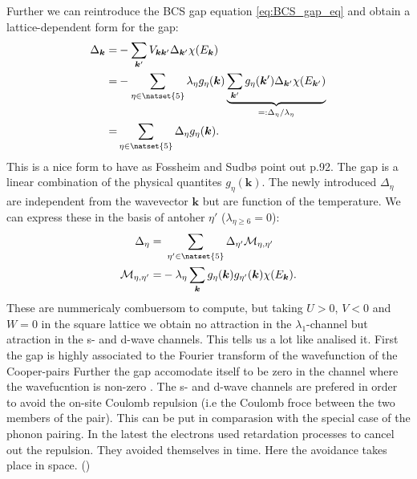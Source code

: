 \documentclass[../main.tex]{subfile}
\begin{document}
Further we can reintroduce the BCS gap equation \ref{eq:BCS_gap_eq} and obtain a lattice-dependent form for the gap:
\begin{equation}
    \begin{aligned}
    \Delta_{\bm{k}} =& -\sum_{\bm{k}'} V_{\bm{k}\bm{k}'}\Delta_{\bm{k}'}\chi(E_{\bm{k}})\\
    =& -\sum_{\eta\in\natset{5}} \lambda_{\eta} g_{\eta}(\bm{k}) \underbrace{\sum_{\bm{k}'} g_{\eta}(\bm{k}') \Delta_{\bm{k}'}\chi(E_{\bm{k}'})}_{=: \Delta_{\eta}/\lambda_{\eta}}\\
    =& \sum_{\eta\in\natset{5}}\Delta_{\eta} g_{\eta}(\bm{k}).
    \end{aligned}
\end{equation}
This is a nice form to have as Fossheim and Sudbø \cite{FossheimSudbo2004} point out p.92. The gap is a linear combination of the physical quantites $g_{\eta}(\bm{k})$.
The newly introduced $\Delta_{\eta}$ are independent from the wavevector $\bm{k}$ but are function of the temperature. We can express these in the basis 
of antoher $\eta'$ ($\lambda_{\eta\ge6} =0$):
\begin{align*}
    \Delta_{\eta} = &~\sum_{\eta' \in \natset{5}} \Delta_{\eta'} \mathcal{M}_{\eta,\eta'}\\
    \mathcal{M}_{\eta,\eta'} =& -\lambda_{\eta}\sum_{\bm{k}} g_{\eta}(\bm{k})g_{\eta'}(\bm{k}) \chi(E_{\bm{k}}).
\end{align*}
These are nummericaly combuersom to compute, but taking $U>0$, $V<0$ and $W=0$ in the square lattice we obtain no attraction  in the 
$\lambda_1$-channel but atraction in the s- and d-wave channels. This tells us a lot like \cite{FossheimSudbo2004} analised it. 
First the gap is highly associated to the Fourier transform of the wavefunction of the Cooper-pairs     
Further the gap accomodate itself to be zero in the channel where the wavefucntion is non-zero .
The s- and d-wave channels are prefered in order to avoid the on-site Coulomb repulsion (i.e the Coulomb froce between the two members of the pair).
This can be put in comparasion with the special
case of the phonon pairing. In the latest the electrons used retardation processes to cancel out the repulsion. They avoided themselves in time. 
Here the avoidance takes place in space. ()\\
\end{document}
